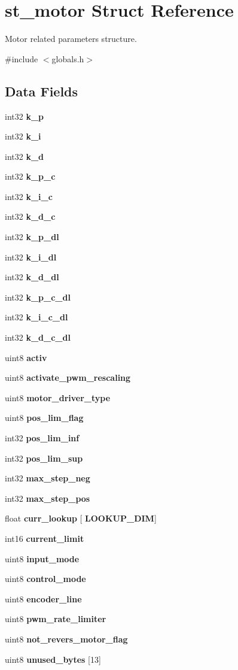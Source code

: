 \section{st\+\_\+motor Struct Reference}
\label{structst__motor}


Motor related parameters structure.  




{\ttfamily \#include $<$globals.\+h$>$}

\subsection*{Data Fields}
\begin{DoxyCompactItemize}
\item 
int32 \textbf{ k\+\_\+p}
\item 
int32 \textbf{ k\+\_\+i}
\item 
int32 \textbf{ k\+\_\+d}
\item 
int32 \textbf{ k\+\_\+p\+\_\+c}
\item 
int32 \textbf{ k\+\_\+i\+\_\+c}
\item 
int32 \textbf{ k\+\_\+d\+\_\+c}
\item 
int32 \textbf{ k\+\_\+p\+\_\+dl}
\item 
int32 \textbf{ k\+\_\+i\+\_\+dl}
\item 
int32 \textbf{ k\+\_\+d\+\_\+dl}
\item 
int32 \textbf{ k\+\_\+p\+\_\+c\+\_\+dl}
\item 
int32 \textbf{ k\+\_\+i\+\_\+c\+\_\+dl}
\item 
int32 \textbf{ k\+\_\+d\+\_\+c\+\_\+dl}
\item 
uint8 \textbf{ activ}
\item 
uint8 \textbf{ activate\+\_\+pwm\+\_\+rescaling}
\item 
uint8 \textbf{ motor\+\_\+driver\+\_\+type}
\item 
uint8 \textbf{ pos\+\_\+lim\+\_\+flag}
\item 
int32 \textbf{ pos\+\_\+lim\+\_\+inf}
\item 
int32 \textbf{ pos\+\_\+lim\+\_\+sup}
\item 
int32 \textbf{ max\+\_\+step\+\_\+neg}
\item 
int32 \textbf{ max\+\_\+step\+\_\+pos}
\item 
float \textbf{ curr\+\_\+lookup} [\textbf{ L\+O\+O\+K\+U\+P\+\_\+\+D\+IM}]
\item 
int16 \textbf{ current\+\_\+limit}
\item 
uint8 \textbf{ input\+\_\+mode}
\item 
uint8 \textbf{ control\+\_\+mode}
\item 
uint8 \textbf{ encoder\+\_\+line}
\item 
uint8 \textbf{ pwm\+\_\+rate\+\_\+limiter}
\item 
uint8 \textbf{ not\+\_\+revers\+\_\+motor\+\_\+flag}
\item 
uint8 \textbf{ unused\+\_\+bytes} [13]
\end{DoxyCompactItemize}


